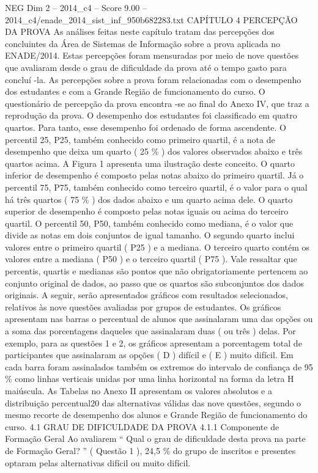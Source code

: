 \begin{textsample}{NEG Dim 2 – 2014\_c4 – Score 9.00 – 2014\_c4/enade\_2014\_sist\_inf\_950b682283.txt}  \label{ex:f2_neg_321}
CAPÍTULO 4 PERCEPÇÃO DA PROVA As análises feitas neste capítulo tratam das percepções dos concluintes da Área de Sistemas de Informação sobre a prova aplicada no ENADE/2014.
Estas percepções foram mensuradas por meio de nove questões que avaliaram desde o grau de dificuldade da prova até o tempo gasto para concluí -la.
As percepções sobre a prova foram relacionadas com o desempenho dos estudantes e com a Grande Região de funcionamento do curso.
O questionário de percepção da prova encontra -se ao final do Anexo IV, que traz a reprodução da prova.
O desempenho dos estudantes foi classificado em quatro quartos.
Para tanto, esse desempenho foi ordenado de forma ascendente.
O percentil 25, P25, também conhecido como primeiro quartil, é a nota de desempenho que deixa um quarto ( 25 \% ) dos valores observados abaixo e três quartos acima.
A Figura 1 apresenta uma ilustração deste conceito.
O quarto inferior de desempenho é composto pelas notas abaixo do primeiro quartil.
Já o percentil 75, P75, também conhecido como terceiro quartil, é o valor para o qual há três quartos ( 75 \% ) dos dados abaixo e um quarto acima dele.
O quarto superior de desempenho é composto pelas notas iguais ou acima do terceiro quartil.
O percentil 50, P50, também conhecido como mediana, é o valor que divide as notas em dois conjuntos de igual tamanho.
O segundo quarto inclui valores entre o primeiro quartil ( P25 ) e a mediana.
O terceiro quarto contém os valores entre a mediana ( P50 ) e o terceiro quartil ( P75 ).
Vale ressaltar que percentis, quartis e medianas são pontos que não obrigatoriamente pertencem ao conjunto original de dados, ao passo que os quartos são subconjuntos dos dados originais.
A seguir, serão apresentados gráficos com resultados selecionados, relativos às nove questões avaliadas por grupos de estudantes.
Os gráficos apresentam nas barras o percentual de alunos que assinalaram uma das opções ou a soma das porcentagens daqueles que assinalaram duas ( ou três ) delas.
Por exemplo, para as questões 1 e 2, os gráficos apresentam a porcentagem total de participantes que assinalaram as opções ( D ) difícil e ( E ) muito difícil.
Em cada barra foram assinalados também os extremos do intervalo de confiança de 95 \% como linhas verticais unidas por uma linha horizontal na forma da letra H maiúscula.
As Tabelas no Anexo II apresentam os valores absolutos e a distribuição percentual20 das alternativas válidas das nove questões, segundo o mesmo recorte de desempenho dos alunos e Grande Região de funcionamento do curso. 4.1 GRAU DE DIFICULDADE DA PROVA 4.1.1 Componente de Formação Geral Ao avaliarem “ Qual o grau de dificuldade desta prova na parte de Formação Geral? ” ( Questão 1 ), 24,5 \% do grupo de inscritos e presentes optaram pelas alternativas difícil ou muito difícil.

\end{textsample}
